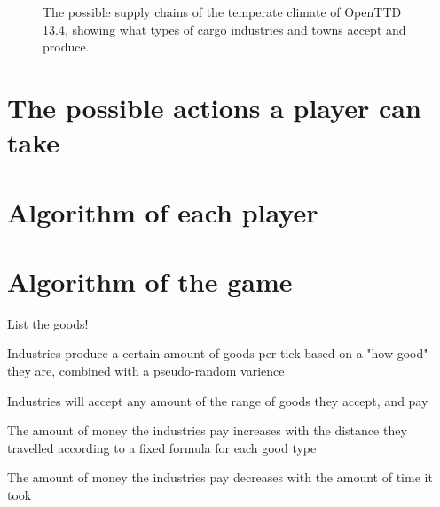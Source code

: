 \documentclass[logo,msc,dsti]{infthesis}    %
\begin{document}
\begin{figure}[h]
\caption{The possible supply chains of the temperate climate of OpenTTD 13.4, showing what types of cargo industries and towns accept and produce.}
\label{figure:temperate-supply-chains}
\end{figure}

\section{The possible actions a player can take}

\section{Algorithm of each player}

\section{Algorithm of the game}



List the goods!

\begin{itemize}
\begin{item}Industries produce a certain amount of goods per tick based on a "how good" they are, combined with a pseudo-random varience\end{item}
\begin{item}Industries will accept any amount of the range of goods they accept, and pay\end{item}
\begin{item}The amount of money the industries pay increases with the distance they travelled according to a fixed formula for each good type\end{item}
\begin{item}The amount of money the industries pay decreases with the amount of time it took\end{item}
\end{itemize}
\end{document}
